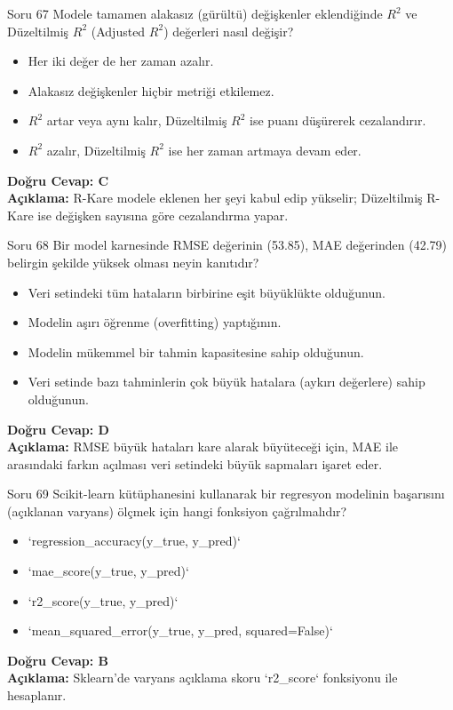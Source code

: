\documentclass[12pt,a4paper]{article}
\begin{document}
\begin{testcard}{Soru 67}
    Modele tamamen alakasız (gürültü) değişkenler eklendiğinde $R^2$ ve Düzeltilmiş $R^2$ (Adjusted $R^2$) değerleri nasıl değişir?
    \begin{itemize}
        \item[A)] Her iki değer de her zaman azalır.
        \item[B)] Alakasız değişkenler hiçbir metriği etkilemez.
        \item[C)] $R^2$ artar veya aynı kalır, Düzeltilmiş $R^2$ ise puanı düşürerek cezalandırır.
        \item[D)] $R^2$ azalır, Düzeltilmiş $R^2$ ise her zaman artmaya devam eder.
    \end{itemize}
    \tcblower
    \textbf{Doğru Cevap: C} \\
    \textbf{Açıklama:} R-Kare modele eklenen her şeyi kabul edip yükselir; Düzeltilmiş R-Kare ise değişken sayısına göre cezalandırma yapar.
\end{testcard}

\begin{testcard}{Soru 68}
    Bir model karnesinde RMSE değerinin (53.85), MAE değerinden (42.79) belirgin şekilde yüksek olması neyin kanıtıdır?
    \begin{itemize}
        \item[A)] Veri setindeki tüm hataların birbirine eşit büyüklükte olduğunun.
        \item[B)] Modelin aşırı öğrenme (overfitting) yaptığının.
        \item[C)] Modelin mükemmel bir tahmin kapasitesine sahip olduğunun.
        \item[D)] Veri setinde bazı tahminlerin çok büyük hatalara (aykırı değerlere) sahip olduğunun.
    \end{itemize}
    \tcblower
    \textbf{Doğru Cevap: D} \\
    \textbf{Açıklama:} RMSE büyük hataları kare alarak büyüteceği için, MAE ile arasındaki farkın açılması veri setindeki büyük sapmaları işaret eder.
\end{testcard}

\begin{testcard}{Soru 69}
    Scikit-learn kütüphanesini kullanarak bir regresyon modelinin başarısını (açıklanan varyans) ölçmek için hangi fonksiyon çağrılmalıdır?
    \begin{itemize}
        \item[A)] `regression_accuracy(y_true, y_pred)`
        \item[B)] `mae_score(y_true, y_pred)`
        \item[C)] `r2_score(y_true, y_pred)`
        \item[D)] `mean_squared_error(y_true, y_pred, squared=False)`
    \end{itemize}
    \tcblower
    \textbf{Doğru Cevap: B} \\
    \textbf{Açıklama:} Sklearn'de varyans açıklama skoru `r2_score` fonksiyonu ile hesaplanır.
\end{testcard}
\end{document}
